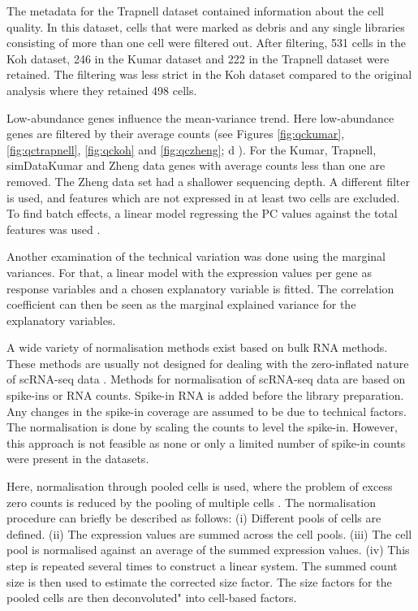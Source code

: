 \documentclass[11pt, a4paper]{article}\usepackage[]{graphicx}\usepackage[]{color}
\begin{document}
The metadata for the Trapnell dataset contained information about the cell quality. In this dataset, cells that were marked as debris and any single libraries consisting of more than one cell were filtered out. After filtering, 531 cells in the Koh dataset, 246 in the Kumar dataset and 222 in the Trapnell dataset were retained. The filtering was less strict in the Koh dataset compared to the original analysis where they retained 498 cells. 

Low-abundance genes influence the mean-variance trend. Here low-abundance genes are filtered by their average counts (see Figures \ref{fig:qckumar}, \ref{fig:qctrapnell}, \ref{fig:qckoh} and \ref{fig:qczheng}; d ). For the Kumar, Trapnell, simDataKumar and Zheng data genes with average counts less than one are removed. The Zheng data set had a shallower sequencing depth. A different filter is used, and features which are not expressed in at least two cells are excluded.
To find batch effects, a linear model regressing the PC values against the total features was used \citep{lun2016step}. 

Another examination of the technical variation was done using the marginal variances\citep{lun2016step}. For that, a linear model with the expression values per gene as response variables and a chosen explanatory variable is fitted. The correlation coefficient can then be seen as the marginal explained variance for the explanatory variables.

A wide variety of normalisation methods exist based on bulk RNA methods. These methods are usually not designed for dealing with the zero-inflated nature of scRNA-seq data \citep{lun2016pooling}. 
Methods for normalisation of scRNA-seq data are based on spike-ins or RNA counts. Spike-in RNA is added before the library preparation. Any changes in the spike-in coverage are assumed to be due to technical factors. The normalisation is done by scaling the counts to level the spike-in. However, this approach is not feasible as none or only a limited number of spike-in counts were present in the datasets.

Here, normalisation through pooled cells is used, where the problem of excess zero counts is reduced by the pooling of multiple cells \citep{lun2016pooling}. The normalisation procedure can briefly be described as follows: (i) Different pools of cells are defined. (ii) The expression values are summed across the cell pools. (iii) The cell pool is normalised against an average of the summed expression values. (iv) This step is repeated several times to construct a linear system. 
The summed count size is then used to estimate the corrected size factor. The size factors for the pooled cells are then deconvoluted" into cell-based factors. 
\end{document}
